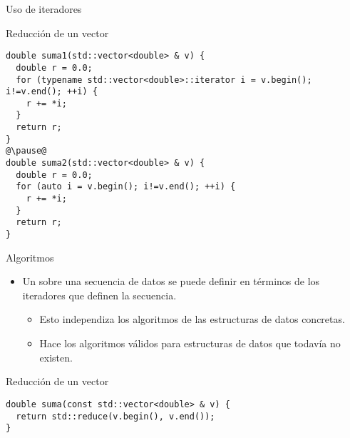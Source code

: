 \begin{frame}[t,fragile]{Uso de iteradores}
\begin{block}{Reducción de un vector}
\begin{lstlisting}[escapechar=@]
double suma1(std::vector<double> & v) {
  double r = 0.0;
  for (typename std::vector<double>::iterator i = v.begin(); i!=v.end(); ++i) {
    r += *i;
  }
  return r;
}
@\pause@
double suma2(std::vector<double> & v) {
  double r = 0.0;
  for (auto i = v.begin(); i!=v.end(); ++i) {
    r += *i;
  }
  return r;
}
\end{lstlisting}
\end{block}
\end{frame}

\begin{frame}[t,fragile]{Algoritmos}
\begin{itemize}
  \item Un  sobre una secuencia de datos se puede
        definir en términos de los iteradores que definen la secuencia.
    \begin{itemize}
      \item Esto independiza los algoritmos de las estructuras de datos concretas.
      \item Hace los algoritmos válidos para estructuras de datos que 
            todavía no existen.
    \end{itemize}
\end{itemize}
\vfill\pause
\begin{block}{Reducción de un vector}
\begin{lstlisting}
double suma(const std::vector<double> & v) {
  return std::reduce(v.begin(), v.end());
}
\end{lstlisting}
\end{block}
\end{frame}
